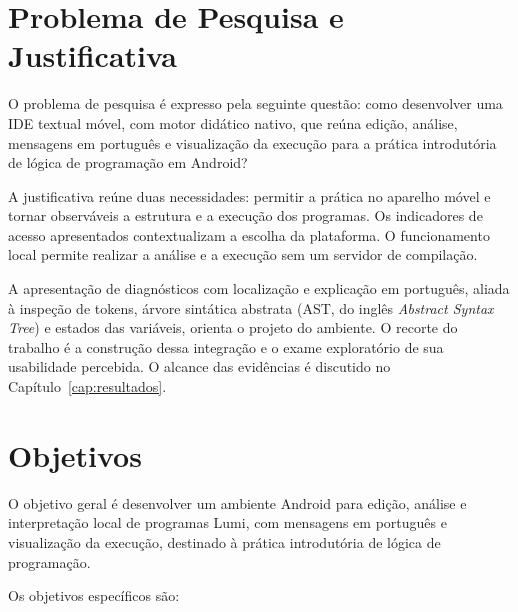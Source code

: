 \documentclass[
    12pt
    ,oneside
    ,a4paper
    ,chapter=TITLE
    ,section=TITLE
    ,sumario=abnt-6027-2012]{abntex2}
\begin{document}
\section{Problema de Pesquisa e Justificativa}

O problema de pesquisa é expresso pela seguinte questão: como desenvolver
uma IDE textual móvel, com motor didático nativo, que reúna edição, análise,
mensagens em português e visualização da execução para a prática introdutória
de lógica de programação em Android?

A justificativa reúne duas necessidades: permitir a prática no aparelho móvel
e tornar observáveis a estrutura e a execução dos programas. Os indicadores de
acesso apresentados contextualizam a escolha da plataforma. O funcionamento local permite
realizar a análise e a execução sem um servidor de compilação.

A apresentação de diagnósticos com localização e explicação em português,
aliada à inspeção de tokens, árvore sintática abstrata (AST, do inglês \textit{Abstract Syntax Tree}) e estados das variáveis, orienta o projeto do
ambiente. O recorte do trabalho é a construção dessa integração e o exame
exploratório de sua usabilidade percebida. O alcance das evidências é discutido
no Capítulo~\ref{cap:resultados}.

\section{Objetivos}

O objetivo geral é desenvolver um ambiente Android para edição, análise e
interpretação local de programas Lumi, com mensagens em português e visualização
da execução, destinado à prática introdutória de lógica de programação.

Os objetivos específicos são:
\end{document}
